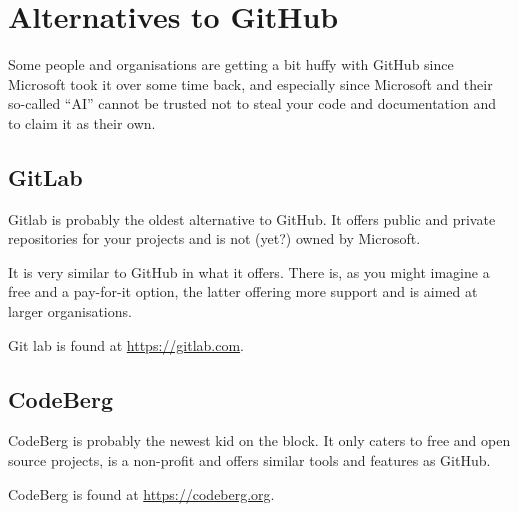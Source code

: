\chapter{Alternatives to GitHub}
Some people and organisations are getting a bit huffy with GitHub since Microsoft took it over some time back, and especially since Microsoft and their so-called ``AI'' cannot be trusted not to steal your code and documentation and to claim it as their own.

\section{GitLab}

Gitlab is probably the oldest alternative to GitHub. It offers public and private repositories for your projects and is not (yet?) owned by Microsoft.

It is very similar to GitHub in what it offers. There is, as you might imagine a free and a pay-for-it option, the latter offering more support and is aimed at larger organisations.

Git lab is found at \url{https://gitlab.com}.

\section{CodeBerg}

CodeBerg is probably the newest kid on the block. It only caters to free and open source projects, is a non-profit and offers similar tools and features as GitHub.

CodeBerg  is found at \url{https://codeberg.org}.